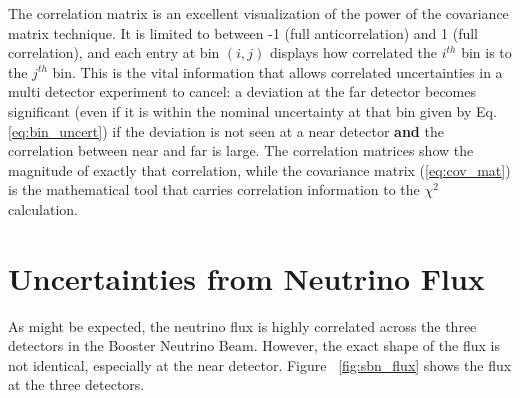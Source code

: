 The correlation matrix is an excellent visualization of the power of the covariance matrix technique.  It is limited to between -1 (full anticorrelation) and 1 (full correlation), and each entry at bin $(i,j)$ displays how correlated the $i^{th}$ bin is to the $j^{th}$ bin.  This is the vital information that allows correlated uncertainties in a multi detector experiment to cancel: a deviation at the far detector becomes significant (even if it is within the nominal uncertainty at that bin given by Eq. \ref{eq:bin_uncert}) if the deviation is not seen at a near detector {\bf and} the correlation between near and far is large.  The correlation matrices show the magnitude of exactly that correlation, while the covariance matrix (\ref{eq:cov_mat}) is the mathematical tool that carries correlation information to the $\chi^2$ calculation.


\section{Uncertainties from Neutrino Flux}

\label{section:flux_uncert}

As might be expected, the neutrino flux is highly correlated across the three detectors in the Booster Neutrino Beam.  However, the exact shape of the flux is not identical, especially at the near detector.  Figure~ \ref{fig:sbn_flux} shows the flux at the three detectors.

